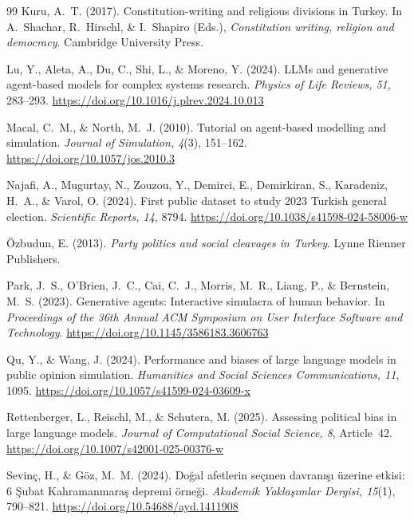 \documentclass[12pt,a4paper]{report}
\begin{document}
\begin{thebibliography}{99}
Kuru, A.~T. (2017). Constitution-writing and religious divisions in Turkey. In A.~Shachar, R.~Hirschl, \& I.~Shapiro (Eds.), \emph{Constitution writing, religion and democracy}. Cambridge University Press.

Lu, Y., Aleta, A., Du, C., Shi, L., \& Moreno, Y. (2024). LLMs and generative agent-based models for complex systems research. \emph{Physics of Life Reviews, 51}, 283--293. \url{https://doi.org/10.1016/j.plrev.2024.10.013}

Macal, C.~M., \& North, M.~J. (2010). Tutorial on agent-based modelling and simulation. \emph{Journal of Simulation, 4}(3), 151--162. \url{https://doi.org/10.1057/jos.2010.3}

Najafi, A., Mugurtay, N., Zouzou, Y., Demirci, E., Demirkiran, S., Karadeniz, H.~A., \& Varol, O. (2024). First public dataset to study 2023 Turkish general election. \emph{Scientific Reports, 14}, 8794. \url{https://doi.org/10.1038/s41598-024-58006-w}

Özbudun, E. (2013). \emph{Party politics and social cleavages in Turkey}. Lynne Rienner Publishers.

Park, J.~S., O'Brien, J.~C., Cai, C.~J., Morris, M.~R., Liang, P., \& Bernstein, M.~S. (2023). Generative agents: Interactive simulacra of human behavior. In \emph{Proceedings of the 36th Annual ACM Symposium on User Interface Software and Technology}. \url{https://doi.org/10.1145/3586183.3606763}

Qu, Y., \& Wang, J. (2024). Performance and biases of large language models in public opinion simulation. \emph{Humanities and Social Sciences Communications, 11}, 1095. \url{https://doi.org/10.1057/s41599-024-03609-x}

Rettenberger, L., Reischl, M., \& Schutera, M. (2025). Assessing political bias in large language models. \emph{Journal of Computational Social Science, 8}, Article~42. \url{https://doi.org/10.1007/s42001-025-00376-w}

Sevinç, H., \& Göz, M.~M. (2024). Doğal afetlerin seçmen davranışı üzerine etkisi: 6 Şubat Kahramanmaraş depremi örneği. \emph{Akademik Yaklaşımlar Dergisi, 15}(1), 790--821. \url{https://doi.org/10.54688/ayd.1411908}


\end{thebibliography}
\end{document}
